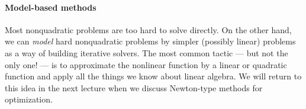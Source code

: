 \documentclass[12pt, leqno]{article} %
\begin{document}
\paragraph{Model-based methods}
Most nonquadratic problems are too hard to solve directly.  On the other
hand, we can {\em model} hard nonquadratic problems by simpler (possibly
linear) problems as a way of building iterative solvers.  The most
common tactic --- but not the only one! --- is to approximate the
nonlinear function by a linear or quadratic function and apply all the
things we know about linear algebra.  We will return to this idea in
the next lecture when we discuss Newton-type methods for optimization.
\end{document}

